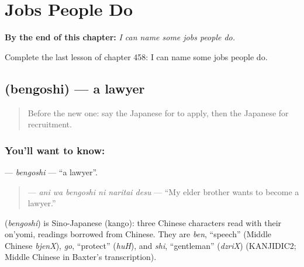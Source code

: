 
\chapter{Jobs People Do}
\label{ch:ja-jobs-people-do}

\begin{chapteropening}
\textbf{By the end of this chapter:} \emph{I can name some jobs people do.}

Complete the last lesson of chapter 458: I can name some jobs people do.
\end{chapteropening}

\section[\texorpdfstring{\ja{べんごし} (bengoshi)}{べんごし (bengoshi)}]{ (bengoshi) — a lawyer}

\label{lesson:JA-C458-bengoshi}



\begin{quote}
Before the new one: say the Japanese for to apply, then the Japanese for recruitment.
\end{quote}

\subsection*{You'll want to know: }
\textbf{} — \emph{bengoshi} — \textquotedblleft{}a lawyer\textquotedblright{}.

\begin{quote}
\textbf{  } — \emph{ani wa bengoshi ni naritai desu} — \textquotedblleft{}My elder brother wants to become a lawyer.\textquotedblright{}
\end{quote}

\begin{cousinweb}
\textbf{} (\emph{bengoshi}) is Sino-Japanese (kango): three Chinese characters read with their on'yomi, readings borrowed from Chinese. They are \emph{ben}, \textquotedblleft{}speech\textquotedblright{} (Middle Chinese \emph{bjenX}), \emph{go}, \textquotedblleft{}protect\textquotedblright{} (\emph{huH}), and \emph{shi}, \textquotedblleft{}gentleman\textquotedblright{} (\emph{dzriX}) (KANJIDIC2; Middle Chinese in Baxter's transcription).
\end{cousinweb}

